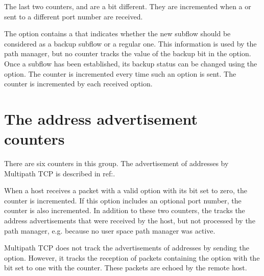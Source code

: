 \documentclass[letterpaper,10pt,english]{sphinxmanual}
\begin{document}
\sphinxAtStartPar
The last two counters,  and
 are a bit different. They are incremented when
a  or  sent to a different port number are received.

\sphinxAtStartPar
The  option contains a  that indicates whether the new
subflow should be considered as a backup subflow or a regular one. This
information is used by the path manager, but no counter tracks the value of
the backup bit in the  option. Once a subflow has been established,
its backup status can be changed using the  option. The
 counter is incremented every time such an option is sent.
The  counter is incremented by each received 
option.


\section{The address advertisement counters}
\label{\detokenize{nstat-mptcp:the-address-advertisement-counters}}
\sphinxAtStartPar
There are six counters in this group. The advertisement of addresses by
Multipath TCP is described in ref:.

\sphinxAtStartPar
When a host receives a packet with a valid  option with its
 bit set to zero, the  counter is incremented.
If this option includes an optional port number, the 
counter is also incremented. In addition to these two counters, the
 tracks the address advertisements that were received
by the host, but not processed by the path manager, e.g. because no user
space path manager was active.

\sphinxAtStartPar
Multipath TCP does not track the advertisements of addresses by sending
the  option. However, it tracks the reception of packets
containing the  option with the  bit set to one with
the  counter. These packets are echoed by the remote host.
\end{document}
